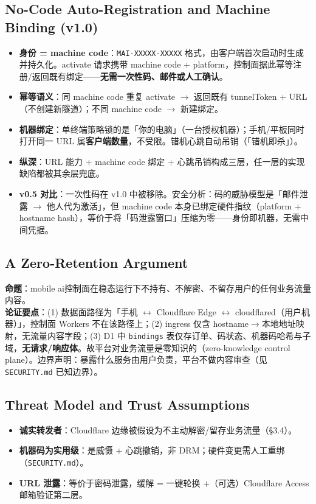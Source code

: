 \documentclass[10pt,a4paper]{article}
\newcommand{\sys}{mobile ai}
\begin{document}
\subsection{No-Code Auto-Registration and Machine Binding (v1.0)}
\begin{itemize}[leftmargin=1.6em,itemsep=0.2em,topsep=0.2em]
  \item \textbf{身份 = machine code}：\texttt{MAI-XXXXX-XXXXX} 格式，由客户端首次启动时生成并持久化。activate 请求携带 machine code + platform，控制面据此幂等注册/返回既有绑定——\textbf{无需一次性码、邮件或人工确认}。
  \item \textbf{幂等语义}：同 machine code 重复 activate $\rightarrow$ 返回既有 tunnelToken + URL（不创建新隧道）；不同 machine code $\rightarrow$ 新建绑定。
  \item \textbf{机器绑定}：单终端策略锁的是「你的电脑」（一台授权机器）；手机/平板同时打开同一 URL 属\textbf{客户端数量}，不受限。错机心跳自动吊销（「错机即杀」）。
  \item \textbf{纵深}：URL 能力 + machine code 绑定 + 心跳吊销构成三层，任一层的实现缺陷都被其余层兜底。
  \item \textbf{v0.5 对比}：一次性码在 v1.0 中被移除。安全分析：码的威胁模型是「邮件泄露 $\rightarrow$ 他人代为激活」，但 machine code 本身已绑定硬件指纹（platform + hostname hash），等价于将「码泄露窗口」压缩为零——身份即机器，无需中间凭据。
\end{itemize}

\subsection{A Zero-Retention Argument}
\noindent\textbf{命题}：\sys 控制面在稳态运行下不持有、不解密、不留存用户的任何业务流量内容。\\
\noindent\textbf{论证要点}：(1) 数据面路径为「手机 $\leftrightarrow$ Cloudflare Edge $\leftrightarrow$ cloudflared（用户机器）」，控制面 Workers 不在该路径上；(2) ingress 仅含 hostname$\rightarrow$本地地址映射，无流量内容字段；(3) D1 中 \texttt{bindings} 表仅存订单、码状态、机器码哈希与子域，\textbf{无请求/响应体}。故平台对业务流量是零知识的（zero-knowledge control plane）。边界声明：暴露什么服务由用户负责，平台不做内容审查（见 \texttt{SECURITY.md} 已知边界）。

\subsection{Threat Model and Trust Assumptions}
\begin{itemize}[leftmargin=1.6em,itemsep=0.2em,topsep=0.2em]
  \item \textbf{诚实转发者}：Cloudflare 边缘被假设为不主动解密/留存业务流量（§3.4）。
  \item \textbf{机器码为实用级}：是威慑 + 心跳撤销，非 DRM；硬件变更需人工重绑（\texttt{SECURITY.md}）。
  \item \textbf{URL 泄露}：等价于密码泄露，缓解 = 一键轮换 +（可选）Cloudflare Access 邮箱验证第二层。
\end{itemize}
\end{document}
